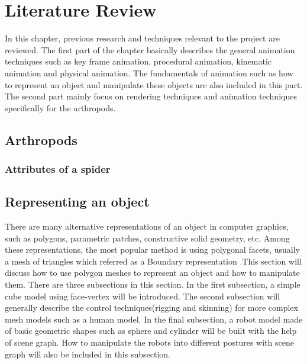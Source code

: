 \chapter{Literature Review}
In this chapter, previous research and techniques relevant to the
project are reviewed. The first part of the chapter basically describes
the general animation techniques such as key frame animation,
procedural animation, kinematic animation and physical animation. The
fundamentals of animation such as how to represent an object and
manipulate these objects are also included in this part. The second
part mainly focus on rendering techniques and animation techniques
specifically for the arthropods.
\section{Arthropods} 

\subsection{Attributes of a spider}


\section{Representing an object} 
There are many alternative representations of an object in computer graphics, such as polygons, parametric patches, constructive solid geometry, etc. Among these representations, the most popular method is using polygonal facets, usually a mesh of triangles which referred as a Boundary representation \cite{alan3D}.This section will discuss how to use polygon meshes to represent an object and how to manipulate them. There are three subsections in this section. In the first subsection, a simple cube model using face-vertex will be introduced. The second subsection will generally describe the control techniques(rigging and skinning) for more complex mesh models such as a human model. In the final subsection, a robot model made of basic geometric shapes such as sphere and cylinder will be built with the help of scene graph. How to manipulate the robots into different postures with scene graph will also be included in this subsection. 

